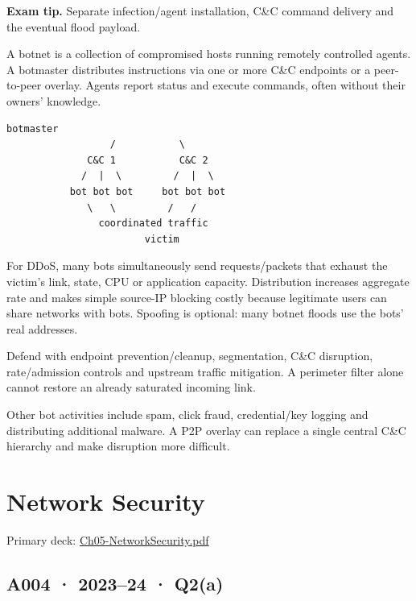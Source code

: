 \documentclass[11pt,a4paper]{article}
\begin{document}
{\color{ForestGreen}\textbf{Exam tip.} Separate infection/\allowbreak{}agent installation,\allowbreak{} C\&C command delivery and the eventual flood payload.}


A botnet is a collection of compromised hosts running remotely controlled agents. A botmaster distributes instructions via one or more C\&C endpoints or a peer-to-peer overlay. Agents report status and execute commands,\allowbreak{} often without their owners' knowledge.



\begin{Verbatim}[breaklines=true,breakanywhere=true,fontsize=\small,frame=single,rulecolor=\color{PanelBorder}]
                    botmaster
                  /           \
              C&C 1           C&C 2
             /  |  \         /  |  \
           bot bot bot     bot bot bot
              \   \         /   /
                coordinated traffic
                        victim
\end{Verbatim}

For DDoS,\allowbreak{} many bots simultaneously send requests/\allowbreak{}packets that exhaust the victim's link,\allowbreak{} state,\allowbreak{} CPU or application capacity. Distribution increases aggregate rate and makes simple source-IP blocking costly because legitimate users can share networks with bots. Spoofing is optional: many botnet floods use the bots' real addresses.


Defend with endpoint prevention/\allowbreak{}cleanup,\allowbreak{} segmentation,\allowbreak{} C\&C disruption,\allowbreak{} rate/\allowbreak{}admission controls and upstream traffic mitigation. A perimeter filter alone cannot restore an already saturated incoming link.


Other bot activities include spam,\allowbreak{} click fraud,\allowbreak{} credential/\allowbreak{}key logging and distributing additional malware. A P2P overlay can replace a single central C\&C hierarchy and make disruption more difficult.



\clearpage
\section{Network Security}

Primary deck: \href{../slides/Ch05-NetworkSecurity.pdf}{Ch05-NetworkSecurity.\allowbreak{}pdf}




\subsection{A004 · 2023–24 · Q2(a)}\label{a004}
\end{document}
